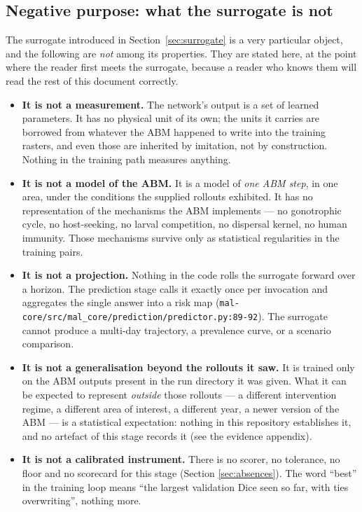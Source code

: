 \documentclass[11pt,a4paper]{article}
\newcommand{\codex}[1]{\texttt{#1}}
\begin{document}
\subsection{Negative purpose: what the surrogate is not}

The surrogate introduced in Section~\ref{sec:surrogate} is a very particular
object, and the following are \emph{not} among its properties. They are stated
here, at the point where the reader first meets the surrogate, because a reader
who knows them will read the rest of this document correctly.

\begin{itemize}
\item \textbf{It is not a measurement.} The network's output is a set of
      learned parameters. It has no physical unit of its own; the units it
      carries are borrowed from whatever the ABM happened to write into the
      training rasters, and even those are inherited by imitation, not by
      construction. Nothing in the training path measures anything.
\item \textbf{It is not a model of the ABM.} It is a model of \emph{one ABM
      step}, in one area, under the conditions the supplied rollouts
      exhibited. It has no representation of the mechanisms the ABM
      implements --- no gonotrophic cycle, no host-seeking, no larval
      competition, no dispersal kernel, no human immunity. Those mechanisms
      survive only as statistical regularities in the training pairs.
\item \textbf{It is not a projection.} Nothing in the code rolls the surrogate
      forward over a horizon. The prediction stage calls it exactly once per
      invocation and aggregates the single answer into a risk map
      (\codex{mal-core/\allowbreak{}src/\allowbreak{}mal\_\allowbreak{}core/\allowbreak{}prediction/\allowbreak{}predictor.py:89-92}). The
      surrogate cannot produce a multi-day trajectory, a prevalence curve, or
      a scenario comparison.
\item \textbf{It is not a generalisation beyond the rollouts it saw.} It is
      trained only on the ABM outputs present in the run directory it was
      given. What it can be expected to represent \emph{outside} those
      rollouts --- a different intervention regime, a different area of
      interest, a different year, a newer version of the ABM --- is a
      statistical expectation: nothing in this repository establishes it,
      and no artefact of this stage records it (see the evidence appendix).
\item \textbf{It is not a calibrated instrument.} There is no scorer, no
      tolerance, no floor and no scorecard for this stage (Section
      \ref{sec:absences}). The word ``best'' in the training loop means
      ``the largest validation Dice seen so far, with ties overwriting'',
      nothing more.
\end{itemize}
\end{document}
